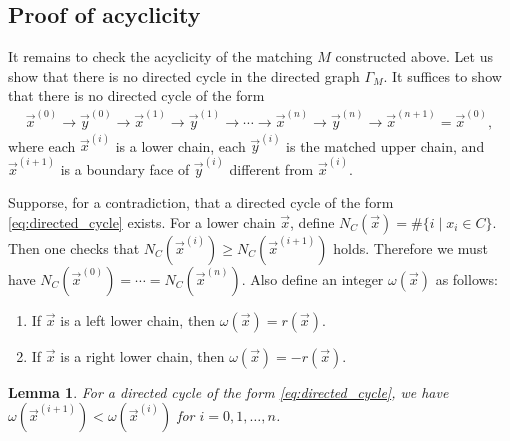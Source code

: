 \documentclass{amsart}
\numberwithin{equation}{section}
\theoremstyle{plain}
\newtheorem{lem}[thm]{Lemma}
\theoremstyle{remark}
\theoremstyle{definition}
\numberwithin{equation}{section}
\begin{document}
\subsection{Proof of acyclicity}
It remains to check the acyclicity of the matching $M$ constructed above.
Let us show that there is no directed cycle in the directed graph $\Gamma_M$.
It suffices to show that there is no directed cycle of the form
\begin{align}
  \vec{x}^{(0)}\to\vec{y}^{(0)}\to \vec{x}^{(1)}\to \vec{y}^{(1)}\to\cdots\to \vec{x}^{(n)}\to\vec{y}^{(n)}\to\vec{x}^{(n+1)}=\vec{x}^{(0)},\label{eq:directed_cycle}
\end{align}
where each $\vec{x}^{(i)}$ is a lower chain, each $\vec{y}^{(i)}$ is the matched upper chain, and $\vec{x}^{(i+1)}$ is a boundary face of $\vec{y}^{(i)}$ different from $\vec{x}^{(i)}$.

Supporse, for a contradiction, that a directed cycle of the form \eqref{eq:directed_cycle} exists.
For a lower chain $\vec{x}$, define $N_C(\vec{x})=\#\{i\mid x_i\in C\}$.
Then one checks that $N_C(\vec{x}^{(i)})\geq N_C(\vec{x}^{(i+1)})$ holds.
Therefore we must have $N_C(\vec{x}^{(0)})=\cdots=N_C(\vec{x}^{(n)})$.
Also define an integer $\omega(\vec{x})$ as follows:
\begin{enumerate}
    \item If $\vec{x}$ is a left lower chain, then $\omega(\vec{x})=r(\vec{x})$.
    \item If $\vec{x}$ is a right lower chain, then $\omega(\vec{x})=-r(\vec{x})$.
\end{enumerate}

\begin{lem}
    For a directed cycle of the form \eqref{eq:directed_cycle}, we have $\omega(\vec{x}^{(i+1)})<\omega(\vec{x}^{(i)})$ for $i=0,1,\dots,n$.
\end{lem}
\end{document}
